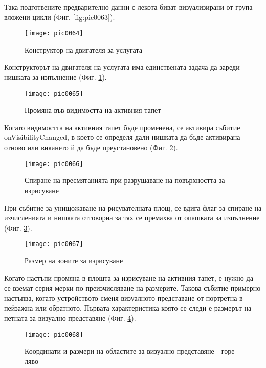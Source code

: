 Така подготвените предварително данни с лекота биват визуализирани от група вложени цикли (Фиг. \ref{fig:pic0063}).

\begin{figure}[h]
  \centering
  \texttt{[image: pic0064]}
  \caption{Конструктор на двигателя за услугата}
\label{fig:pic0064}
\end{figure}
\FloatBarrier

Конструкторът на двигателя на услугата има единствената задача да зареди нишката за изпълнение (Фиг. \ref{fig:pic0064}).

\begin{figure}[h]
  \centering
  \texttt{[image: pic0065]}
  \caption{Промяна във видимостта на активния тапет}
\label{fig:pic0065}
\end{figure}
\FloatBarrier

Когато видимостта на активния тапет бъде променена, се активира събитие onVisibilityChanged, в което се определя дали нишката да бъде активирана отново или викането й да бъде преустановено (Фиг. \ref{fig:pic0065}).

\begin{figure}[h]
  \centering
  \texttt{[image: pic0066]}
  \caption{Спиране на пресмятанията при разрушаване на повърхността за изрисуване}
\label{fig:pic0066}
\end{figure}
\FloatBarrier

При събитие за унищожаване на рисувателната площ, се вдига флаг за спиране на изчисленията и нишката отговорна за тях се премахва от опашката за изпълнение (Фиг. \ref{fig:pic0066}).

\begin{figure}[h]
  \centering
  \texttt{[image: pic0067]}
  \caption{Размер на зоните за изрисуване}
\label{fig:pic0067}
\end{figure}
\FloatBarrier

Когато настъпи промяна в площта за изрисуване на активния тапет, е нужно да се вземат серия мерки по преизчисляване на размерите. Такова събитие примерно настъпва, когато устройството сменя визуалното представане от портретна в пейзажна или обратното. Първата характеристика която се следи е размерът на петната за визуално представяне (Фиг. \ref{fig:pic0067}).


\begin{figure}[h]
  \centering
  \texttt{[image: pic0068]}
  \caption{Координати и размери на областите за визуално представяне - горе-ляво}
\label{fig:pic0068}
\end{figure}
\FloatBarrier

